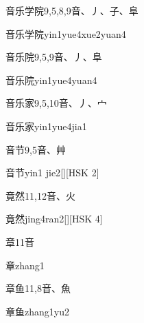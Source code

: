 \begin{entry}{音乐学院}{9,5,8,9}{⾳、⼃、⼦、⾩}
  \begin{phonetics}{音乐学院}{yin1yue4xue2yuan4}
  \end{phonetics}
\end{entry}

\begin{entry}{音乐院}{9,5,9}{⾳、⼃、⾩}
  \begin{phonetics}{音乐院}{yin1yue4yuan4}
  \end{phonetics}
\end{entry}

\begin{entry}{音乐家}{9,5,10}{⾳、⼃、⼧}
  \begin{phonetics}{音乐家}{yin1yue4jia1}
  \end{phonetics}
\end{entry}

\begin{entry}{音节}{9,5}{⾳、⾋}
  \begin{phonetics}{音节}{yin1 jie2}[][HSK 2]
  \end{phonetics}
\end{entry}

\begin{entry}{竟然}{11,12}{⾳、⽕}
  \begin{phonetics}{竟然}{jing4ran2}[][HSK 4]
  \end{phonetics}
\end{entry}

\begin{entry}{章}{11}{⾳}
  \begin{phonetics}{章}{zhang1}
  \end{phonetics}
\end{entry}

\begin{entry}{章鱼}{11,8}{⾳、⿂}
  \begin{phonetics}{章鱼}{zhang1yu2}
  \end{phonetics}
\end{entry}


